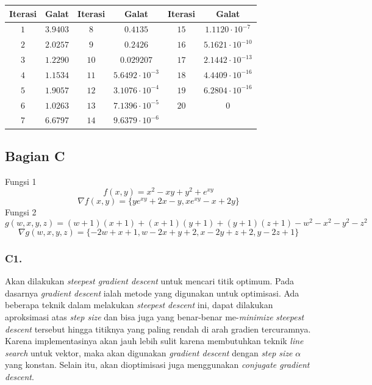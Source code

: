\documentclass[11pt, a4paper, onecolumn, oneside, final]{report}
\begin{document}
\begin{table}[H]
\centering
\begin{tabular}{|c|c|c|c|c|c|}
\hline
\textbf{Iterasi} & \textbf{Galat} & \textbf{Iterasi} & \textbf{Galat} & \textbf{Iterasi} & \textbf{Galat} \\ \hline
$1$ & $3.9403$ & $8$ & $0.4135$ & $15$ & $1.1120 \cdot 10^{-7}$ \\ \hline
$2$ & $2.0257$ & $9$ & $0.2426$ & $16$ & $5.1621 \cdot 10^{-10}$ \\ \hline
$3$ & $1.2290$ & $10$ & $0.029207$ & $17$ & $2.1442 \cdot 10^{-13}$ \\ \hline
$4$ & $1.1534$ & $11$ & $5.6492 \cdot 10^{-3}$ & $18$ & $4.4409 \cdot 10^{-16}$ \\ \hline
$5$ & $1.9057$ & $12$ & $3.1076 \cdot 10^{-4}$ & $19$ & $6.2804 \cdot 10^{-16}$ \\ \hline
$6$ & $1.0263$ & $13$ & $7.1396 \cdot 10^{-5}$ & $20$ & $0$ \\ \hline
$7$ & $6.6797$ & $14$ & $9.6379 \cdot 10^{-6}$ &  &  \\ \hline
\end{tabular}
\end{table}

\subsection*{Bagian C}

Fungsi 1
$$
f(x,y) = x^2 - xy + y^2 + e^{xy}
$$
$$
\nabla f(x,y) = \{y e^{x y}+2 x-y, x e^{x y}-x+2 y\}
$$
Fungsi 2
$$
g(w,x,y,z) = (w+1)(x+1) + (x+1)(y+1) + (y+1)(z+1) - w^2 - x^2 - y^2 - z^2
$$
$$
\nabla g(w,x,y,z) = \{-2w + x + 1, w-2 x+y+2, x-2 y+z+2, y-2 z+1\}
$$

\subsubsection*{C1.}
Akan dilakukan \textit{steepest gradient descent} untuk mencari titik optimum. Pada dasarnya \textit{gradient descent} ialah metode yang digunakan untuk optimisasi. Ada beberapa teknik dalam melakukan \textit{steepest descent} ini, dapat dilakukan aproksimasi atas \textit{step size} dan bisa juga yang benar-benar me-\textit{minimize} \textit{steepest descent} tersebut hingga titiknya yang paling rendah di arah gradien tercuramnya. Karena implementasinya akan jauh lebih sulit karena membutuhkan teknik \textit{line search} untuk vektor, maka akan digunakan \textit{gradient descent} dengan \textit{step size} $\alpha$ yang konstan. Selain itu, akan dioptimisasi juga menggunakan \textit{conjugate gradient descent}.
\end{document}
